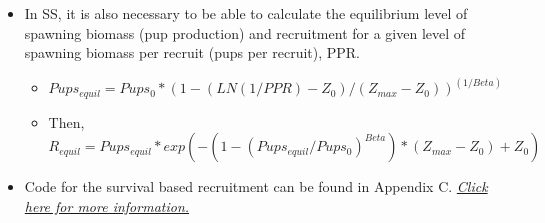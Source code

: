 \begin{itemize}
		\item In SS, it is also necessary to be able to calculate the equilibrium level of spawning biomass (pup production) and recruitment for a given level of spawning biomass per recruit (pups per recruit), PPR.
		\begin{itemize}
			\item $Pups_{equil} = Pups_0 * (1 - (LN(1/PPR) - Z_0)/(Z_{max} - Z_0))^{(1/Beta)} $
			\item Then, $R_{equil} = Pups_{equil} * exp(-(1 - (Pups_{equil}/Pups_0)^{Beta})*(Z_{max}-Z_0)+Z_0)$
		\end{itemize}
		\item Code for the survival based recruitment can be found in Appendix C. \hyperlink{AppendixC}{\textit{Click here for more information.}}
	\end{itemize}